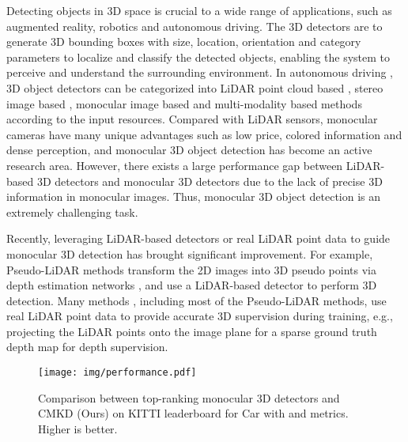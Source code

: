 \documentclass[runningheads]{llncs}
\begin{document}
Detecting objects in 3D space is crucial to a wide range of applications, such as augmented reality, robotics and autonomous driving. The 3D detectors are to generate 3D bounding boxes with size, location, orientation and category parameters to localize and classify the detected objects, enabling the system to perceive and understand the surrounding environment.
In autonomous driving \cite{KITTI,Waymo,nuscenes}, 3D object detectors can be categorized into LiDAR point cloud based \cite{voxelrcnn,pvrcnn,pointrcnn}, stereo image based \cite{stereorcnn,rt3dstereo,disprcnn}, monocular image based \cite{MonoRCNN,monogrnet,luo2021m3dssd} and multi-modality based methods \cite{joint3d,clocs} according to the input resources. 
Compared with LiDAR sensors, monocular cameras have many unique advantages such as low price, colored information and dense perception, and monocular 3D object detection has become an active research area.
However, there exists a large performance gap between LiDAR-based 3D detectors and monocular 3D detectors due to the lack of precise 3D information in monocular images.
Thus, monocular 3D object detection is an extremely challenging task.

Recently, leveraging LiDAR-based detectors or real LiDAR point data to guide monocular 3D detection has brought significant improvement.
For example, Pseudo-LiDAR methods \cite{PL,monopl,AMOD} transform the 2D images into 3D pseudo points via depth estimation networks \cite{DORN,bts}, and use a LiDAR-based detector \cite{fpointnet,AVOD} to perform 3D detection.
Many methods \cite{PL,monopl,AMOD,CADDN,dd3d}, including most of the Pseudo-LiDAR methods, use real LiDAR point data to provide accurate 3D supervision during training, e.g., projecting the LiDAR points onto the image plane for a sparse ground truth depth map for depth supervision.

\begin{figure*}[t]
  \centering
   \texttt{[image: img/performance.pdf]}
   \caption{Comparison between top-ranking monocular 3D detectors and CMKD (Ours) on KITTI leaderboard \cite{KITTI} for Car with  and  metrics. Higher is better.}
   \label{fig:performance}
\end{figure*}
\end{document}
